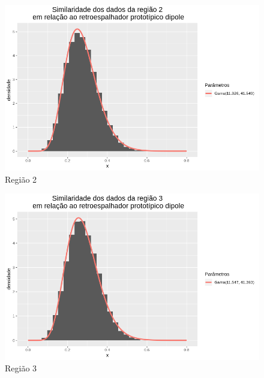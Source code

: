 \documentclass[12pt]{article}
\begin{document}
\begin{figure}[!h]
    \centering
    \includegraphics[width = \linewidth]{../../Images/Report_18_12_20/dip_region2.png}
    \caption{Região 2}
    \label{fig:dip_r2}
\end{figure}

\begin{figure}[!h]
    \centering
    \vspace{0.1\linewidth}
    \includegraphics[width = \linewidth]{../../Images/Report_18_12_20/dip_region3.png}
    \caption{Região 3}
    \label{fig:dip_r3}
\end{figure}
\end{document}
